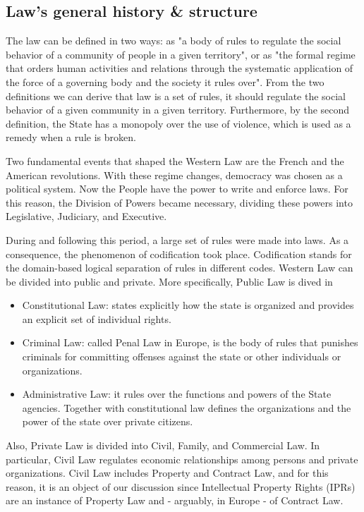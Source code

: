 \subsection*{Law's general history & structure}

The law can be defined in two ways: as "a body of rules to regulate the social behavior of a community of people in a given territory", or as "the formal regime that orders human activities and relations through the systematic application of the force of a governing body and the society it rules over". From the two definitions we can derive that law is a set of rules, it should regulate the social behavior of a given community in a given territory. Furthermore, by the second definition, the State has a monopoly over the use of violence, which is used as a remedy when a rule is broken.

Two fundamental events that shaped the Western Law are the French and the American revolutions. With these regime changes, democracy was chosen as a political system. Now the People have the power to write and enforce laws. For this reason, the Division of Powers became necessary, dividing these powers into Legislative, Judiciary, and Executive.

During and following this period, a large set of rules were made into laws. As a consequence, the phenomenon of codification took place. Codification stands for the domain-based logical separation of rules in different codes. Western Law can be divided into public and private. More specifically, Public Law is dived in

\begin{itemize}
    \item Constitutional Law: states explicitly how the state is organized and provides an explicit set of individual rights.
    \item Criminal Law: called Penal Law in Europe, is the body of rules that punishes criminals for committing offenses against the state or other individuals or organizations.
    \item Administrative Law: it rules over the functions and powers of the State agencies. Together with constitutional law defines the organizations and the power of the state over private citizens.
\end{itemize}

Also, Private Law is divided into Civil, Family, and Commercial Law. In particular, Civil Law regulates economic relationships among persons and private organizations. Civil Law includes Property and Contract Law, and for this reason, it is an object of our discussion since Intellectual Property Rights (IPRs) are an instance of Property Law and - arguably, in Europe - of Contract Law.

